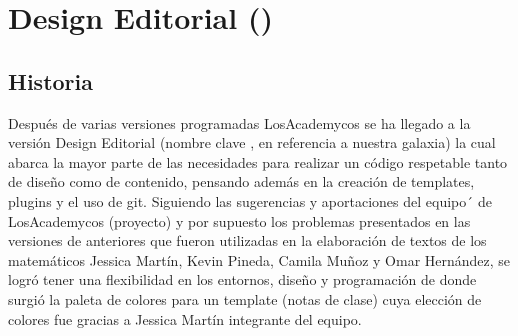 {\justifying
\chapter[Design Editorial \printversion]{Design Editorial \printversion\space (\printkeyname)}
	\section{Historia}
	Después de varias versiones programadas LosAcademycos se ha llegado a la versión Design Editorial \printversion\space (nombre clave \printkeyname, en referencia a nuestra galaxia) la cual abarca la mayor parte de las necesidades para realizar un código respetable tanto de diseño como de contenido, pensando además en la creación de templates, plugins y el uso de git. 
	\pap 
	Siguiendo las sugerencias y aportaciones del equipo´ de LosAcademycos (proyecto) y por supuesto los problemas presentados en las versiones de anteriores que fueron utilizadas en la elaboración de textos de los matemáticos Jessica Martín, Kevin Pineda, Camila Muñoz y Omar Hernández, se logró tener una flexibilidad en los entornos, diseño y programación de donde surgió la paleta de colores para un template (notas de clase) cuya elección de colores fue gracias a Jessica Martín integrante del equipo. 
	    
}
